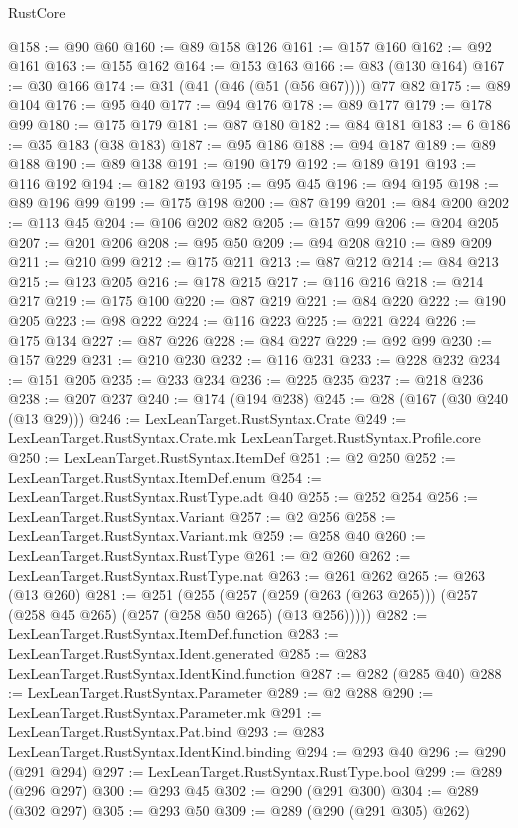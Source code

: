 \begin{lexlean}{RustCore}
\begin{coremodule}
@158 := @90 @60
@160 := @89 @158 @126
@161 := @157 @160
@162 := @92 @161
@163 := @155 @162
@164 := @153 @163
@166 := @83 (@130 @164)
@167 := @30 @166
@174 := @31 (@41 (@46 (@51 (@56 @67)))) @77 @82
@175 := @89 @104
@176 := @95 @40
@177 := @94 @176
@178 := @89 @177
@179 := @178 @99
@180 := @175 @179
@181 := @87 @180
@182 := @84 @181
@183 := 6
@186 := @35 @183 (@38 @183)
@187 := @95 @186
@188 := @94 @187
@189 := @89 @188
@190 := @89 @138
@191 := @190 @179
@192 := @189 @191
@193 := @116 @192
@194 := @182 @193
@195 := @95 @45
@196 := @94 @195
@198 := @89 @196 @99
@199 := @175 @198
@200 := @87 @199
@201 := @84 @200
@202 := @113 @45
@204 := @106 @202 @82
@205 := @157 @99
@206 := @204 @205
@207 := @201 @206
@208 := @95 @50
@209 := @94 @208
@210 := @89 @209
@211 := @210 @99
@212 := @175 @211
@213 := @87 @212
@214 := @84 @213
@215 := @123 @205
@216 := @178 @215
@217 := @116 @216
@218 := @214 @217
@219 := @175 @100
@220 := @87 @219
@221 := @84 @220
@222 := @190 @205
@223 := @98 @222
@224 := @116 @223
@225 := @221 @224
@226 := @175 @134
@227 := @87 @226
@228 := @84 @227
@229 := @92 @99
@230 := @157 @229
@231 := @210 @230
@232 := @116 @231
@233 := @228 @232
@234 := @151 @205
@235 := @233 @234
@236 := @225 @235
@237 := @218 @236
@238 := @207 @237
@240 := @174 (@194 @238)
@245 := @28 (@167 (@30 @240 (@13 @29)))
@246 := LexLeanTarget.RustSyntax.Crate
@249 := LexLeanTarget.RustSyntax.Crate.mk LexLeanTarget.RustSyntax.Profile.core
@250 := LexLeanTarget.RustSyntax.ItemDef
@251 := @2 @250
@252 := LexLeanTarget.RustSyntax.ItemDef.enum
@254 := LexLeanTarget.RustSyntax.RustType.adt @40
@255 := @252 @254
@256 := LexLeanTarget.RustSyntax.Variant
@257 := @2 @256
@258 := LexLeanTarget.RustSyntax.Variant.mk
@259 := @258 @40
@260 := LexLeanTarget.RustSyntax.RustType
@261 := @2 @260
@262 := LexLeanTarget.RustSyntax.RustType.nat
@263 := @261 @262
@265 := @263 (@13 @260)
@281 := @251
    (@255 (@257 (@259 (@263 (@263 @265))) (@257 (@258 @45 @265) (@257 (@258 @50 @265) (@13 @256)))))
@282 := LexLeanTarget.RustSyntax.ItemDef.function
@283 := LexLeanTarget.RustSyntax.Ident.generated
@285 := @283 LexLeanTarget.RustSyntax.IdentKind.function
@287 := @282 (@285 @40)
@288 := LexLeanTarget.RustSyntax.Parameter
@289 := @2 @288
@290 := LexLeanTarget.RustSyntax.Parameter.mk
@291 := LexLeanTarget.RustSyntax.Pat.bind
@293 := @283 LexLeanTarget.RustSyntax.IdentKind.binding
@294 := @293 @40
@296 := @290 (@291 @294)
@297 := LexLeanTarget.RustSyntax.RustType.bool
@299 := @289 (@296 @297)
@300 := @293 @45
@302 := @290 (@291 @300)
@304 := @289 (@302 @297)
@305 := @293 @50
@309 := @289 (@290 (@291 @305) @262)

\end{coremodule}
\end{lexlean}
